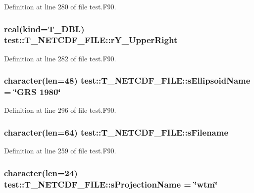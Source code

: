 Definition at line 280 of file test.F90.

\hypertarget{typetest_1_1_t___n_e_t_c_d_f___f_i_l_e_a1a157d33af50d8436033673c12f6cb66}{
\subsubsection[{rY\_\-UpperRight}]{\setlength{\rightskip}{0pt plus 5cm}real(kind={\bf T\_\-DBL}) {\bf test::T\_\-NETCDF\_\-FILE::rY\_\-UpperRight}}}
\label{typetest_1_1_t___n_e_t_c_d_f___f_i_l_e_a1a157d33af50d8436033673c12f6cb66}


Definition at line 282 of file test.F90.

\hypertarget{typetest_1_1_t___n_e_t_c_d_f___f_i_l_e_a130a9d42f981cfc37b0b4d44c37e1786}{
\subsubsection[{sEllipsoidName}]{\setlength{\rightskip}{0pt plus 5cm}character(len=48) {\bf test::T\_\-NETCDF\_\-FILE::sEllipsoidName} = \char`\"{}GRS 1980\char`\"{}}}
\label{typetest_1_1_t___n_e_t_c_d_f___f_i_l_e_a130a9d42f981cfc37b0b4d44c37e1786}


Definition at line 296 of file test.F90.

\hypertarget{typetest_1_1_t___n_e_t_c_d_f___f_i_l_e_aa90ec19a5d751f946a49686321825f21}{
\subsubsection[{sFilename}]{\setlength{\rightskip}{0pt plus 5cm}character(len=64) {\bf test::T\_\-NETCDF\_\-FILE::sFilename}}}
\label{typetest_1_1_t___n_e_t_c_d_f___f_i_l_e_aa90ec19a5d751f946a49686321825f21}


Definition at line 259 of file test.F90.

\hypertarget{typetest_1_1_t___n_e_t_c_d_f___f_i_l_e_ad9db4ce3ff5b9f14b4284581f8fb72af}{
\subsubsection[{sProjectionName}]{\setlength{\rightskip}{0pt plus 5cm}character(len=24) {\bf test::T\_\-NETCDF\_\-FILE::sProjectionName} = \char`\"{}wtm\char`\"{}}}
\label{typetest_1_1_t___n_e_t_c_d_f___f_i_l_e_ad9db4ce3ff5b9f14b4284581f8fb72af}


